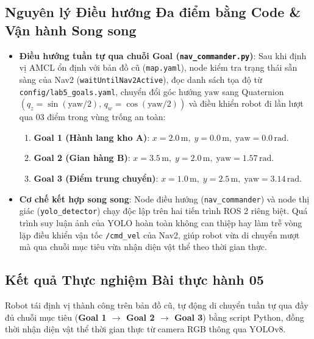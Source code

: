 \documentclass[12pt, a4paper]{article}
\begin{document}
\subsection{Nguyên lý Điều hướng Đa điểm bằng Code \& Vận hành Song song}
\begin{itemize}
    \item \textbf{Điều hướng tuần tự qua chuỗi Goal (\texttt{nav\_commander.py})}: Sau khi định vị AMCL ổn định với bản đồ cũ (\texttt{map.yaml}), node kiểm tra trạng thái sẵn sàng của Nav2 (\texttt{waitUntilNav2Active}), đọc danh sách tọa độ từ \texttt{config/lab5\_goals.yaml}, chuyển đổi góc hướng $\text{yaw}$ sang Quaternion $(q_z = \sin(\text{yaw}/2),\, q_w = \cos(\text{yaw}/2))$ và điều khiển robot đi lần lượt qua 03 điểm trong vùng trống an toàn:
    \begin{enumerate}
        \item \textbf{Goal 1 (Hành lang kho A)}: $x = 2.0\,\text{m},\; y = 0.0\,\text{m},\; \text{yaw} = 0.0\,\text{rad}$.
        \item \textbf{Goal 2 (Gian hàng B)}: $x = 3.5\,\text{m},\; y = 2.0\,\text{m},\; \text{yaw} = 1.57\,\text{rad}$.
        \item \textbf{Goal 3 (Điểm trung chuyển)}: $x = 1.0\,\text{m},\; y = 2.5\,\text{m},\; \text{yaw} = 3.14\,\text{rad}$.
    \end{enumerate}
    \item \textbf{Cơ chế kết hợp song song}: Node điều hướng (\texttt{nav\_commander}) và node thị giác (\texttt{yolo\_detector}) chạy độc lập trên hai tiến trình ROS 2 riêng biệt. Quá trình suy luận ảnh của YOLO hoàn toàn không can thiệp hay làm trễ vòng lặp điều khiển vận tốc \texttt{/cmd\_vel} của Nav2, giúp robot vừa di chuyển mượt mà qua chuỗi mục tiêu vừa nhận diện vật thể theo thời gian thực.
\end{itemize}

\subsection{Kết quả Thực nghiệm Bài thực hành 05}
Robot tái định vị thành công trên bản đồ cũ, tự động di chuyển tuần tự qua đầy đủ chuỗi mục tiêu (\textbf{Goal 1 $\rightarrow$ Goal 2 $\rightarrow$ Goal 3}) bằng script Python, đồng thời nhận diện vật thể thời gian thực từ camera RGB thông qua YOLOv8.

\begin{figure}[H]
    \centering
\end{figure}
\end{document}
